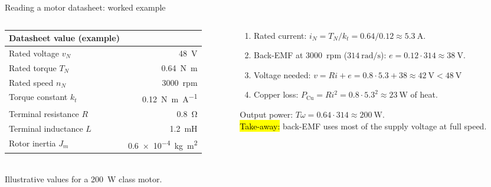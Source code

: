 \documentclass[aspectratio=169,10pt]{beamer}
\begin{document}
\begin{frame}{Reading a motor datasheet: worked example}
\begin{columns}[T]
\begin{column}{.45\textwidth}
\small
\renewcommand{\arraystretch}{1.1}
\begin{tabular}{@{}lr@{}}
\toprule
\textbf{Datasheet value (example)} & \\
\midrule
Rated voltage $v_N$ & \SI{48}{\volt}\\
Rated torque $T_N$ & \SI{0.64}{\newton\metre}\\
Rated speed $n_N$ & \SI{3000}{rpm}\\
Torque constant $k_t$ & \SI{0.12}{\newton\metre\per\ampere}\\
Terminal resistance $R$ & \SI{0.8}{\ohm}\\
Terminal inductance $L$ & \SI{1.2}{\milli\henry}\\
Rotor inertia $J_m$ & \SI{0.6e-4}{\kilo\gram\metre\squared}\\
\bottomrule
\end{tabular}\\[1mm]
{\scriptsize\color{mkGray} Illustrative values for a \SI{200}{\watt} class motor.}
\end{column}
\begin{column}{.52\textwidth}
\begin{defbox}
\small
\begin{enumerate}\setlength\itemsep{2pt}
\item Rated current: $i_N=T_N/k_t=0.64/0.12\approx\SI{5.3}{\ampere}$.
\item Back-EMF at \SI{3000}{rpm} ($\SI{314}{\radian\per\second}$): $e=0.12\cdot314\approx\SI{38}{\volt}$.
\item Voltage needed: $v=Ri+e=0.8\cdot5.3+38\approx\SI{42}{\volt}<\SI{48}{\volt}$ \checkmark
\item Copper loss: $P_\text{Cu}=Ri^2=0.8\cdot5.3^2\approx\SI{23}{\watt}$ of heat.
\end{enumerate}
\end{defbox}
\small
Output power: $T\omega=0.64\cdot314\approx\SI{200}{\watt}$.\\
\hl{Take-away:} back-EMF uses most of the supply voltage at full speed.
\end{column}
\end{columns}
\end{frame}
\end{document}
